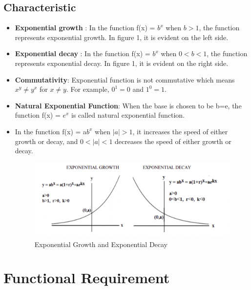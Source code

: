 \documentclass[a4paper,12pt]{report}
\begin{document}
\subsection{Characteristic}
\begin{itemize}


  \item \textbf{Exponential growth} : In the function  f(x) = $b^{x}$ when  $b > 1$, the function represents exponential growth. In figure 1, it is evident on the left side. \cite{b3}

  \item \textbf{Exponential decay} : In the function  f(x) = $b^{x}$ when  $0 < b < 1$, the function represents exponential decay. In figure 1, it is evident on the right side.\cite{b3}

   \item \textbf{Commutativity}:  Exponential function is not commutative which means $x^y \ne y^x $ for $x\ne y$. For example, $0^1 = 0$ and $1^0 = 1$.

   \item \textbf{Natural Exponential Function}: When the base is chosen to be b=e, the function f(x) = $e^x$ is called natural exponential function.\cite{b1}

   \item \textbf{} In the function f(x) = a$b^{x}$  when $|a| > 1$, it increases the speed of either growth or decay, and $0<|a|<1$ decreases the speed of either growth or decay.\cite{b2}

\begin{figure}
\includegraphics[width=15cm]{ExponentialGrowthandDecay.png}
\caption{Exponential Growth and Exponential Decay}
\label{exp}
\end{figure}



\end{itemize}

\section{Functional Requirement}
\end{document}
